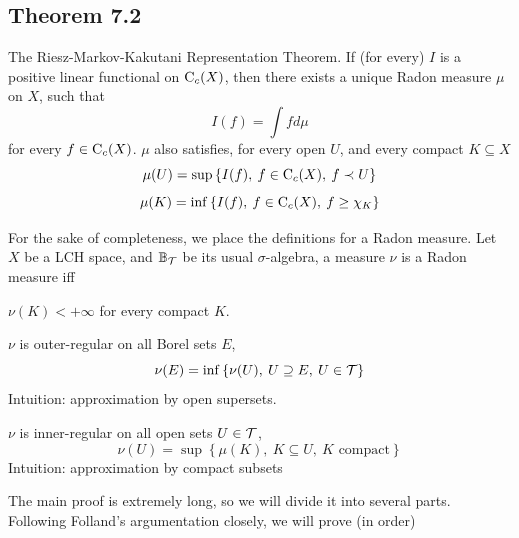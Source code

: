 \documentclass[../../main.tex]{subfiles}
\begin{document}
\subsection{Theorem 7.2}

\begin{wts}
    The Riesz-Markov-Kakutani Representation Theorem. If (for every) $I$ is a positive linear functional on $\operatorname{C}_c({X})$, then there exists a unique Radon measure $\mu$ on $X$, such that
    \[
    I(f) = \int fd\mu
    \]
    for every $f\in\operatorname{C}_c({X})$. $\mu$ also satisfies, for every open $U$, and every compact $K\subseteq X$
    \begin{equation}\label{open approximated by If}
        \mu(U) = \sup\left\{I(f),\:f\in\operatorname{C}_c({X}),\:f\prec U\right\}
    \end{equation}
    \begin{equation}\label{compact approximated by If}
        \mu(K)=\inf\left\{I(f),\:f\in\operatorname{C}_c({X}),\:f\geq\chi_K\right\}
    \end{equation}
\end{wts}
\newcommand{\borel}{\mathbb{B}_{\Tau}} %
\newcommand{\mustar}{\mu^*} %
%
For the sake of completeness, we place the definitions for a Radon measure. Let $X$ be a LCH space, and $\borel$ be its usual $\sigma$-algebra, a measure $\nu$ is a Radon measure iff
\begin{enumroman}
    \item $\nu(K)<+\infty$ for every compact $K$.
    \item $\nu$ is outer-regular on all Borel sets $E$,
    \[
    \nu(E) = \inf\left\{\nu(U),\: U\supseteq E,\:U\in\mathcal{T}\right\}
    \]
    Intuition: approximation by open supersets.
    \item $\nu$ is inner-regular on all open sets $U\in\mathcal{T}$,
    \[
    \nu(U) = \sup\left\{\mu(K),\: K\subseteq U,\:K\text{ compact}\right\}
    \]
    Intuition: approximation by compact subsets 
\end{enumroman}
%
%
The main proof is extremely long, so we will divide it into several parts. Following Folland's argumentation closely, we will prove (in order)
%
%
\end{document}
